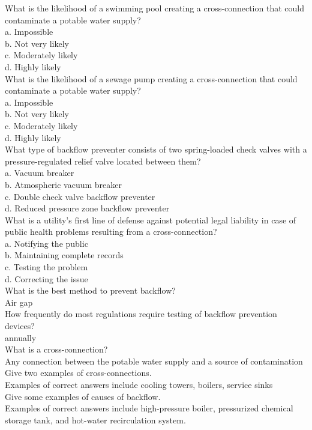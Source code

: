 What is the likelihood of a swimming pool creating a cross-connection that could contaminate a potable water supply?\\
a.	Impossible\\
b.	Not very likely\\
c.	Moderately likely\\
d.	Highly likely\\
What is the likelihood of a sewage pump creating a cross-connection that could contaminate a potable water supply?\\
a.	Impossible\\
b.	Not very likely\\
c.	Moderately likely\\
d.	Highly likely\\
What type of backflow preventer consists of two spring-loaded check valves with a pressure-regulated relief valve located between them? \\
a.	Vacuum breaker\\
b.	Atmospheric vacuum breaker\\
c.	Double check valve backflow preventer\\
d.	Reduced pressure zone backflow preventer\\
What is a utility's first line of defense against potential legal liability in case of public health problems resulting from a cross-connection?\\
a.	Notifying the public\\
b.	Maintaining complete records\\
c.	Testing the problem\\
d.	Correcting the issue\\
What is the best method to prevent backflow?\\
Air gap\\
How frequently do most regulations require testing of backflow prevention devices?\\
annually\\
What is a cross-connection?\\
Any connection between the potable water supply and a source of contamination\\
Give two examples of cross-connections.\\
Examples of correct answers include cooling towers, boilers, service sinks\\
Give some examples of causes of backflow.\\
Examples of correct answers include high-pressure boiler, pressurized chemical storage tank, and hot-water recirculation system.\\

